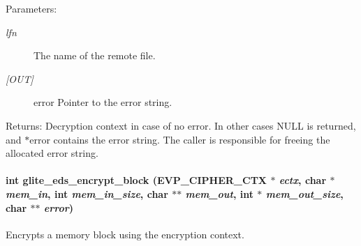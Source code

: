 \begin{Desc}
\item[Parameters:]
\begin{description}
\item[{\em lfn}]The name of the remote file. \item[{\em \mbox{[}OUT\mbox{]}}]error Pointer to the error string.\end{description}
\end{Desc}
\begin{Desc}
\item[Returns:]Decryption context in case of no error. In other cases NULL is returned, and $\ast$error contains the error string. The caller is responsible for freeing the allocated error string. \end{Desc}
\hypertarget{eds-simple_8h_a4}{
\paragraph[glite\_\-eds\_\-encrypt\_\-block]{\setlength{\rightskip}{0pt plus 5cm}int glite\_\-eds\_\-encrypt\_\-block (EVP\_\-CIPHER\_\-CTX $\ast$ {\em ectx}, char $\ast$ {\em mem\_\-in}, int {\em mem\_\-in\_\-size}, char $\ast$$\ast$ {\em mem\_\-out}, int $\ast$ {\em mem\_\-out\_\-size}, char $\ast$$\ast$ {\em error})}\hfill}
\label{eds-simple_8h_a4}


Encrypts a memory block using the encryption context. 

